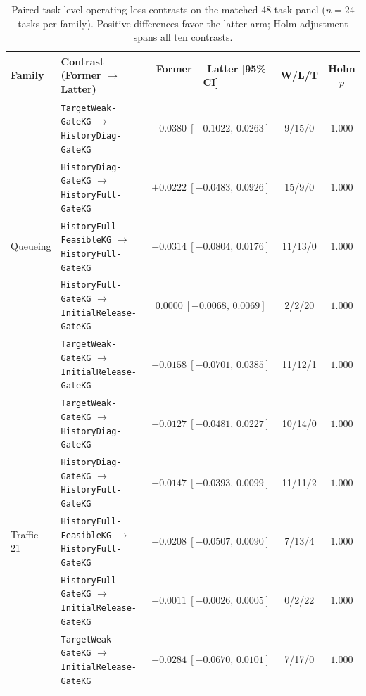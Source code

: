 \begin{table}[htbp]\centering
\caption{Paired task-level operating-loss contrasts on the matched 48-task panel ($n=24$ tasks per family). Positive differences favor the latter arm; Holm adjustment spans all ten contrasts.}\label{tab:matched_contrasts}
\scriptsize\begin{tabular}{llccc}\toprule
\textbf{Family} & \textbf{Contrast (Former $\to$ Latter)} & \textbf{Former $-$ Latter [95\% CI]} & \textbf{W/L/T} & \textbf{Holm $p$} \\
\midrule
\multirow{5}{*}{Queueing} & \texttt{TargetWeak-GateKG} $\to$ \texttt{HistoryDiag-GateKG} & $-0.0380\ [-0.1022,\,0.0263]$ & 9/15/0 & $1.000$ \\
 & \texttt{HistoryDiag-GateKG} $\to$ \texttt{HistoryFull-GateKG} & $+0.0222\ [-0.0483,\,0.0926]$ & 15/9/0 & $1.000$ \\
 & \texttt{HistoryFull-FeasibleKG} $\to$ \texttt{HistoryFull-GateKG} & $-0.0314\ [-0.0804,\,0.0176]$ & 11/13/0 & $1.000$ \\
 & \texttt{HistoryFull-GateKG} $\to$ \texttt{InitialRelease-GateKG} & $0.0000\ [-0.0068,\,0.0069]$ & 2/2/20 & $1.000$ \\
 & \texttt{TargetWeak-GateKG} $\to$ \texttt{InitialRelease-GateKG} & $-0.0158\ [-0.0701,\,0.0385]$ & 11/12/1 & $1.000$ \\
\midrule
\multirow{5}{*}{Traffic-21} & \texttt{TargetWeak-GateKG} $\to$ \texttt{HistoryDiag-GateKG} & $-0.0127\ [-0.0481,\,0.0227]$ & 10/14/0 & $1.000$ \\
 & \texttt{HistoryDiag-GateKG} $\to$ \texttt{HistoryFull-GateKG} & $-0.0147\ [-0.0393,\,0.0099]$ & 11/11/2 & $1.000$ \\
 & \texttt{HistoryFull-FeasibleKG} $\to$ \texttt{HistoryFull-GateKG} & $-0.0208\ [-0.0507,\,0.0090]$ & 7/13/4 & $1.000$ \\
 & \texttt{HistoryFull-GateKG} $\to$ \texttt{InitialRelease-GateKG} & $-0.0011\ [-0.0026,\,0.0005]$ & 0/2/22 & $1.000$ \\
 & \texttt{TargetWeak-GateKG} $\to$ \texttt{InitialRelease-GateKG} & $-0.0284\ [-0.0670,\,0.0101]$ & 7/17/0 & $1.000$ \\
\bottomrule\end{tabular}
\end{table}
